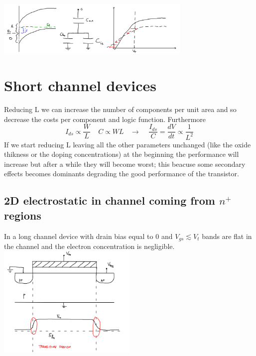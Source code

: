 \centering
\includegraphics[width=0.7\textwidth]{interfacest.png}\\
\raggedright


\section{Short channel devices}

Reducing L we can increase the number of components per unit area and so decrease the costs per component and logic function. Furthermore
\begin{equation}
I_{ds}\propto \frac{W}{L} \ \ \ \ \ C\propto WL \ \ \ \ \rightarrow \ \ \ \ \ \frac{I_{ds}}{C}=\frac{dV}{dt}\propto \frac{1}{L^2}
\end{equation}
If we start reducing L leaving all the other parameters unchanged (like the oxide thikness or the doping concentrations) at the beginning the performance will increase but after a while they will become worst; this beacuse some secondary effects becomes dominants degrading the good performance of the transistor.

\subsection{2D electrostatic in channel coming from $n^+$ regions}
In a long channel device with drain bias equal to 0 and $V_{gs} \lesssim V_t$ bands are flat in the channel and the electron concentration is negligible.\\

\centering
\includegraphics[width=0.5\textwidth]{longch.png}\\
\raggedright

